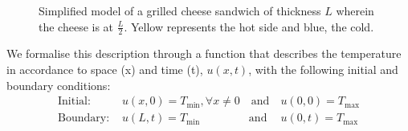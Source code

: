 \begin{figure}[h]
%		
%		
%		
%		
%		
%		
%		
%		
%

	\caption{Simplified model of a grilled cheese sandwich of thickness $L$ wherein the cheese is at $\frac{L}{2}$. Yellow represents the hot side and blue, the cold.}
	\label{fig:cheeseHotToCold}
\end{figure}

We formalise this description through a function that describes the temperature in accordance to space (x) and time (t), $u(x,t)$, with the following initial and boundary conditions:
\begin{equation}\label{eq:BoundaryConditions}
\begin{split}
	\text{Initial: }&u(x,0) = T_{\min}, \forall x \ne 0 \quad \text{and} \quad u(0,0) = T_{\max} \\
	\text{Boundary: }& u(L,t) = T_{\min} \quad\quad\quad\quad\text{  and}\quad \ u(0,t) = T_{\max}  \\
\end{split}
\end{equation}

